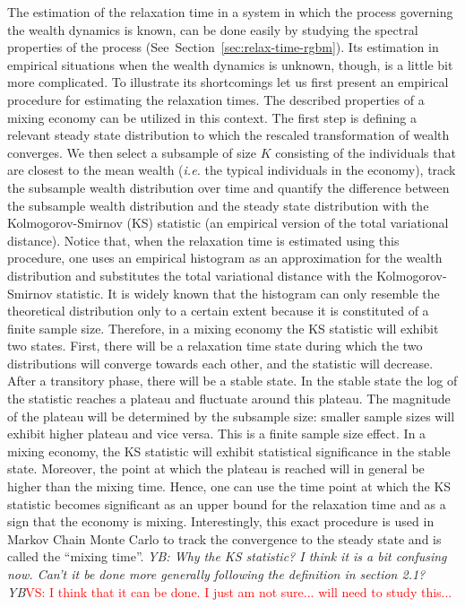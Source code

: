 \documentclass[11pt]{article}
\newcommand{\blue}[1]{{\color{blue} #1}}
\newcommand{\Sref}[1]{Section~\ref{sec:#1}}
\newcommand{\ie}{{\it i.e.}\xspace}
\newcommand{\YB}[1]{\blue{{\it YB: #1 YB}}}
\numberwithin{equation}{section}
\begin{document}
The estimation of the relaxation time in a system in which the process governing the wealth dynamics is known, can be done easily by studying the spectral properties of the process (See~\Sref{relax-time-rgbm}). Its estimation in empirical situations when the wealth dynamics is unknown, though, is a little bit more complicated. To illustrate its shortcomings let us first present an empirical procedure for estimating the relaxation times. The described properties of a mixing economy can be utilized in this context. The first step is defining a relevant steady state distribution to which the rescaled transformation of wealth converges. We then select a subsample of size $K$ consisting of the individuals that are closest to the mean wealth (\ie the typical individuals in the economy), track the subsample wealth distribution over time and quantify the difference between the subsample wealth distribution and the steady state distribution with the Kolmogorov-Smirnov (KS) statistic (an empirical version of the total variational distance). Notice that, when the relaxation time is estimated using this procedure, one uses an empirical histogram as an approximation for the wealth distribution and substitutes the total variational distance with the Kolmogorov-Smirnov  statistic. It is widely known that the histogram can only resemble the theoretical distribution only to a certain extent because it is constituted of a finite sample size. Therefore, in a mixing economy the KS statistic will exhibit two states. First, there will be a relaxation time state during which the two distributions will converge towards each other, and the statistic will decrease. After a transitory phase, there will be a stable state. In the stable state the log of the statistic reaches a plateau and fluctuate around this plateau. The magnitude of the plateau will be determined by the subsample size: smaller sample sizes will exhibit higher plateau and vice versa. This is a finite sample size effect. In a mixing economy, the KS statistic will exhibit statistical significance in the stable state. Moreover, the point at which the plateau is reached will in general be higher than the mixing time. Hence, one can use the time point at which the KS statistic becomes significant as an upper bound for the relaxation time and as a sign that the economy is mixing. Interestingly, this exact procedure is used in Markov Chain Monte Carlo to track the convergence to the steady state and is called the ``mixing time''.
\YB{Why the KS statistic? I think it is a bit confusing now. Can't it be done more generally following the definition in section 2.1? }\textcolor{red}{VS: I think that it can be done. I just am not sure... will need to study this...}
\end{document}
